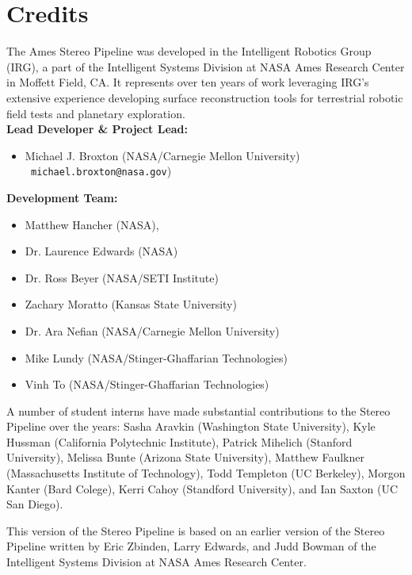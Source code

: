 \chapter*{Credits}

The Ames Stereo Pipeline was developed in the Intelligent Robotics
Group (IRG), a part of the Intelligent Systems Division at NASA Ames
Research Center in Moffett Field, CA.  It represents over ten years of
work leveraging IRG's extensive experience developing surface
reconstruction tools for terrestrial robotic field tests and planetary
exploration. \\ 

{\bf Lead Developer \& Project Lead:}
\begin {itemize} 
\item Michael J. Broxton (NASA/Carnegie Mellon University)\\ {\tt
  michael.broxton@nasa.gov})\\
\end{itemize}

{\bf Development Team:}
\begin{itemize}
\item Matthew Hancher (NASA),
\item Dr. Laurence Edwards (NASA)
\item Dr. Ross Beyer (NASA/SETI Institute)
\item Zachary Moratto (Kansas State University)
\item Dr. Ara Nefian (NASA/Carnegie Mellon University)
\item Mike Lundy (NASA/Stinger-Ghaffarian Technologies)\\ 
\item Vinh To (NASA/Stinger-Ghaffarian Technologies)
\end{itemize}

A number of student interns have made substantial contributions to the
Stereo Pipeline over the years: Sasha Aravkin (Washington State
University), Kyle Hussman (California Polytechnic Institute), Patrick
Mihelich (Stanford University), Melissa Bunte (Arizona State
University), Matthew Faulkner (Massachusetts Institute of Technology),
Todd Templeton (UC Berkeley), Morgon Kanter (Bard Colege), Kerri Cahoy
(Standford University), and Ian Saxton (UC San Diego).

This version of the Stereo Pipeline is based on an earlier version of
the Stereo Pipeline written by Eric Zbinden, Larry Edwards, and Judd
Bowman of the Intelligent Systems Division at NASA Ames Research
Center.

